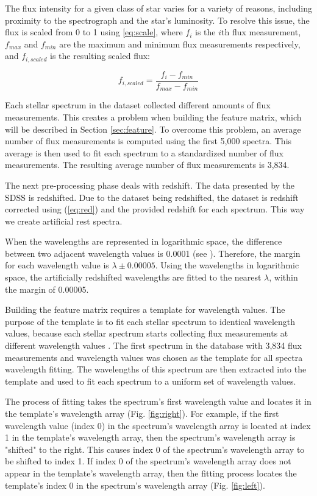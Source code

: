 \documentclass[conference]{IEEEtran}
\begin{document}
The flux intensity for a given class of star varies for a variety of reasons, including proximity to the spectrograph and the star's luminosity. To resolve this issue, the flux is scaled from 0 to 1 using \eqref{eq:scale}, where $f_i$ is the \(i\)th  flux measurement, $f_{max}$ and $f_{min}$ are the maximum and minimum flux measurements respectively, and $f_{i, scaled}$ is the resulting scaled flux:
        
        \begin{equation}\label{eq:scale}
            f_{i, scaled} = \frac{f_i - f_{min}}{f_{max} - f_{min}}
        \end{equation}
        
	Each stellar spectrum in the dataset collected different amounts of flux measurements. This creates a problem when building the feature matrix, which will be described in Section \ref{sec:feature}. To overcome this problem, an average number of flux measurements is computed using the first 5,000 spectra. This average is then used to fit each spectrum to a standardized number of flux measurements. The resulting average number of flux measurements is 3,834.
        
	The next pre-processing phase deals with redshift. The data presented by the SDSS is redshifted. Due to the dataset being redshifted, the dataset is redshift corrected using (\ref{eq:red}) and the provided redshift for each spectrum. This way we create artificial rest spectra.

When the wavelengths are represented in logarithmic space, the difference between two adjacent wavelength values is 0.0001 (see \cite{dr14}). Therefore, the margin for each wavelength value is $\lambda\pm0.00005$. Using the wavelengths in logarithmic space, the artificially redshifted wavelengths are fitted to the nearest $\lambda$, within the margin of 0.00005.

        Building the feature matrix requires a template for wavelength values. The purpose of the template is to fit each stellar spectrum to identical wavelength values, because each stellar spectrum starts collecting flux measurements at different wavelength values \cite{dr14}. The first spectrum in the database with 3,834 flux measurements and wavelength values was chosen as the template for all spectra wavelength fitting. The wavelengths of this spectrum are then extracted into the template and used to fit each spectrum to a uniform set of wavelength values.

	The process of fitting takes the spectrum's first wavelength value and locates it in the template's wavelength array (Fig. \ref{fig:right}). For example, if the first wavelength value (index 0) in the spectrum's wavelength array is located at index 1 in the template's wavelength array, then the spectrum's wavelength array is "shifted" to the right. This causes index 0 of the spectrum's wavelength array to be shifted to index 1. If index 0 of the spectrum's wavelength array does not appear in the template's wavelength array, then the fitting process locates the template's index 0 in the spectrum's wavelength array (Fig. \ref{fig:left}).
        
\end{document}
